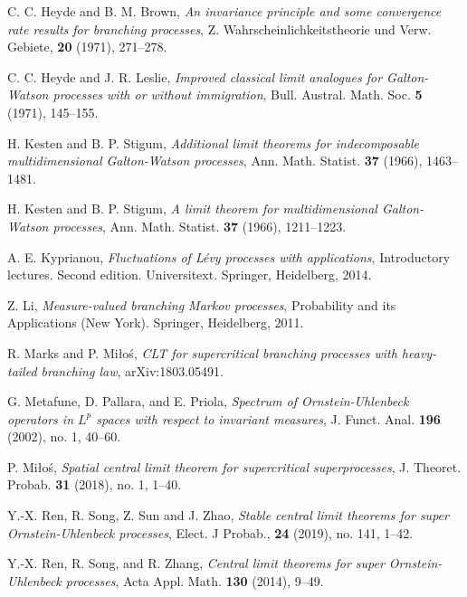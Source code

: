 \documentclass[12pt,a4paper]{amsart}
\theoremstyle{plain}
\theoremstyle{definition}
\numberwithin{equation}{section}
\begin{document}
\begin{thebibliography}{10}
  C. C. Heyde and B. M. Brown,
  \emph{An invariance principle and some convergence rate results for branching processes},
 Z. Wahrscheinlichkeitstheorie und Verw. Gebiete, \textbf{20} (1971), 271--278.

  C. C. Heyde and J. R. Leslie,
  \emph{Improved classical limit analogues for {G}alton-{W}atson processes with or without immigration},
  Bull. Austral. Math. Soc. \textbf{5} (1971), 145--155.

  H. Kesten and B. P. Stigum,
  \emph{Additional limit theorems for indecomposable multidimensional {G}alton-{W}atson processes},
  Ann. Math. Statist. \textbf{37} (1966), 1463--1481.

  H. Kesten and B. P. Stigum,
  \emph{A limit theorem for multidimensional {G}alton-{W}atson processes},
  Ann. Math. Statist. \textbf{37} (1966), 1211--1223.

  A. E. Kyprianou,
  \emph{Fluctuations of {L}\'{e}vy processes with applications},
    Introductory lectures. Second edition. Universitext. Springer, Heidelberg, 2014.

  Z. Li,
  \emph{Measure-valued branching {M}arkov processes},
  Probability and its Applications (New York). Springer, Heidelberg, 2011.

  R. Marks and P. Mi{\l}o{\'s},
  \emph{C{LT} for supercritical branching processes with heavy-tailed branching law},
  arXiv:1803.05491.

  G. Metafune, D. Pallara, and E. Priola,
  \emph{Spectrum of {O}rnstein-{U}hlenbeck operators in {$L^p$} spaces with respect to invariant  measures},
  J. Funct. Anal. \textbf{196} (2002), no. 1, 40--60.

  P. Mi{\l}o{\'s},
  \emph{Spatial central limit theorem for supercritical superprocesses},
  J. Theoret. Probab. \textbf{31} (2018), no. 1, 1--40.

Y.-X. Ren, R. Song, Z. Sun and J. Zhao,
\emph{Stable central limit theorems for super Ornstein-Uhlenbeck processes},
Elect. J Probab., \textbf{24} (2019), no. 141, 1--42.

  Y.-X. Ren, R. Song, and R. Zhang,
  \emph{Central limit theorems for super {O}rnstein-{U}hlenbeck processes},
  Acta Appl. Math. \textbf{130} (2014), 9--49.


\end{thebibliography}
\end{document}
